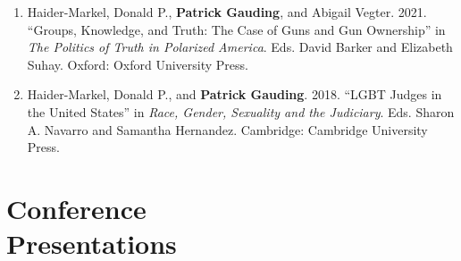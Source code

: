 \documentclass[margin,line,pifont,palatino,courier]{res}
\begin{document}
\begin{resume}
\begin{enumerate}
\item Haider-Markel, Donald P., \textbf{Patrick Gauding}, and Abigail
  Vegter. 2021. ``Groups, Knowledge, and Truth: The Case of Guns and Gun
  Ownership'' in \textit{The Politics of Truth in Polarized
    America}. Eds. David Barker and Elizabeth Suhay. Oxford: Oxford
  University Press.

\item Haider-Markel, Donald P., and \textbf{Patrick Gauding}. 2018. ``LGBT Judges
in the United States'' in \textit{Race, Gender, Sexuality and the
  Judiciary}. Eds. Sharon A. Navarro  and Samantha
Hernandez. Cambridge: Cambridge University Press.

\end{enumerate}








\section{\sc Conference \\ Presentations}


\end{resume}
\end{document}
